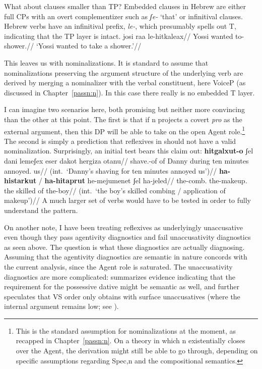 What about clauses smaller than TP? Embedded clauses in Hebrew are either full CPs with an overt complementizer such as \emph{ʃe-} `that' or infinitival clauses. Hebrew verbs have an infinitival prefix, \emph{le-}, which presumably spells out T, indicating that the TP layer is intact.
\ex
	\begingl
	\gla josi ra{\ts}a le-hitkaleax//
	\glb Yossi wanted to-shower.//
	\glft `Yossi wanted to take a shower.'//
	\endgl
\xe

This leaves us with nominalizations. It is standard to assume that nominalizations preserving the argument structure of the underlying verb are derived by merging a nominalizer with the verbal constituent, here VoiceP (as discussed in Chapter~\ref{passn:n}). In this case there really is no embedded T layer.

I can imagine two scenarios here, both promising but neither more convincing than the other at this point. The first is that if n projects a covert \emph{pro} as the external argument, then this DP will be able to take on the open Agent role.\footnote{This is the standard assumption for nominalizations at the moment, as recapped in Chapter~\ref{passn:n}. On a theory in which n existentially closes over the Agent, the derivation might still be able to go through, depending on specific assumptions regarding Spec,n and the compositional semantics.} The second is simply a prediction that reflexives in {\thit} should not have a valid nominalization. Surprisingly, an initial test bears this claim out:
\pex
	\a {} \begingl
		\gla \textbf{hitgalxut-o} ʃel dani lemeʃex eser dakot hergiza otanu//
		\glb shave.-of of Danny during ten minutes annoyed. us//
		\glft (int.~`Danny's shaving for ten minutes annoyed us')//
	\endgl
	\a {} \begingl
		\gla \textbf{ha-histarkut} / \textbf{ha-hitaprut} he-mejumenet ʃel ha-jeled//
		\glb the-comb. {} the-makeup. the skilled of the-boy//
		\glft (int.~`the boy's skilled combing / application of makeup')//
	\endgl
\xe 
A much larger set of verbs would have to be tested in order to fully understand the pattern.

On another note, I have been treating reflexives as underlyingly unaccusative even though they pass agentivity diagnostics and fail unaccusativity diagnostics as seen above. The question is what these diagnostics are actually diagnosing. Assuming that the agentivity diagnostics are semantic in nature concords with the current analysis, since the Agent role is saturated. The unaccusativity diagnostics are more complicated: \cite{kastner17gjgl} summarizes evidence indicating that the requirement for the possessive dative might be semantic as well, and further speculates that VS order only obtains with surface unaccusatives (where the internal argument remains low; see \citealt{unaccusativity95}).

